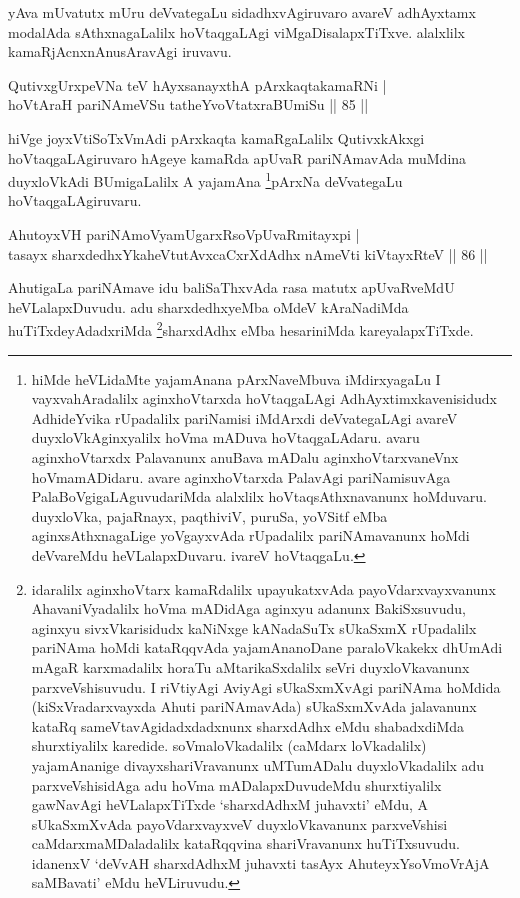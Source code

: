 \begin{artha}
yAva mUvatutx mUru deVvategaLu sidadhxvAgiruvaro avareV adhAyxtamx 
modalAda sAthxnagaLalilx hoVtaqgaLAgi viMgaDisalapxTiTxve. alalxlilx 
kamaRjAcnxnAnusAravAgi iruvavu.
\end{artha}

\begin{shl}
QutivxgUrxpeVNa teV hAyxsanayxthA pArxkaqtakamaRNi | \\
hoVtAraH pariNAmeVSu tatheYvoVtatxraBUmiSu \hfill|| 85 || 
\end{shl}

\begin{artha}
hiVge joyxVtiSoTxVmAdi pArxkaqta kamaRgaLalilx QutivxkAkxgi 
hoVtaqgaLAgiruvaro hAgeye kamaRda apUvaR pariNAmavAda muMdina 
duyxloVkAdi BUmigaLalilx A yajamAna \footnote{hiMde heVLidaMte 
yajamAnana pArxNaveMbuva iMdirxyagaLu I vayxvahAradalilx 
aginxhoVtarxda hoVtaqgaLAgi AdhAyxtimxkavenisidudx AdhideYvika 
rUpadalilx pariNamisi iMdArxdi deVvategaLAgi avareV duyxloVkAginxyalilx 
hoVma mADuva hoVtaqgaLAdaru. avaru aginxhoVtarxdx Palavanunx anuBava 
mADalu aginxhoVtarxvaneVnx hoVmamADidaru. avare aginxhoVtarxda PalavAgi 
pariNamisuvAga PalaBoVgigaLAguvudariMda alalxlilx hoVtaqsAthxnavanunx 
hoMduvaru. duyxloVka, pajaRnayx, paqthiviV, puruSa, yoVSitf eMba 
aginxsAthxnagaLige yoVgayxvAda rUpadalilx pariNAmavanunx hoMdi 
deVvareMdu heVLalapxDuvaru. ivareV hoVtaqgaLu.}pArxNa deVvategaLu 
hoVtaqgaLAgiruvaru.
\end{artha}


\begin{shl}
AhutoyxVH pariNAmoV\s yamUgarxRsoV\s pUvaRmitayxpi | \\
tasayx sharxdedhxYkaheVtutAvxcaCxrXdAdhx nAmeVti kiVtayxRteV \hfill|| 86 || 
\end{shl}

\begin{artha}
AhutigaLa pariNAmave idu baliSaThxvAda rasa matutx apUvaRveMdU heVLalapxDuvudu. adu sharxdedhxyeMba oMdeV kAraNadiMda huTiTxdeyAdadxriMda \footnote{idaralilx aginxhoVtarx kamaRdalilx upayukatxvAda payoVdarxvayxvanunx AhavaniVyadalilx hoVma mADidAga aginxyu adanunx BakiSxsuvudu, aginxyu sivxVkarisidudx kaNiNxge kANadaSuTx sUkaSxmX rUpadalilx pariNAma hoMdi kataRqqvAda yajamAnanoDane paraloVkakekx dhUmAdi mAgaR karxmadalilx horaTu aMtarikaSxdalilx seVri duyxloVkavanunx parxveVshisuvudu. I riVtiyAgi AviyAgi sUkaSxmXvAgi pariNAma hoMdida (kiSxVradarxvayxda Ahuti pariNAmavAda) sUkaSxmXvAda jalavanunx kataRq sameVtavAgidadxdadxnunx sharxdAdhx eMdu shabadxdiMda shurxtiyalilx karedide. soVmaloVkadalilx (caMdarx loVkadalilx) yajamAnanige divayxshariVravanunx uMTumADalu duyxloVkadalilx adu parxveVshisidAga adu hoVma mADalapxDuvudeMdu shurxtiyalilx gawNavAgi heVLalapxTiTxde `sharxdAdhxM juhavxti' eMdu, A sUkaSxmXvAda payoVdarxvayxveV duyxloVkavanunx parxveVshisi caMdarxmaMDaladalilx kataRqqvina shariVravanunx huTiTxsuvudu. idanenxV `deVvAH sharxdAdhxM juhavxti tasAyx AhuteyxYsoVmoVrAjA saMBavati' eMdu heVLiruvudu.}sharxdAdhx eMba hesariniMda kareyalapxTiTxde.
\end{artha}

